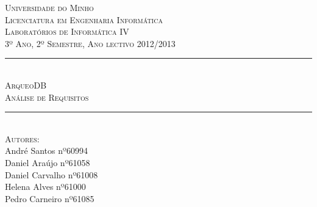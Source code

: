﻿\documentclass[12pt,a4paper]{article}
\begin{document}
\begin{titlepage}
\onehalfspacing

\newcommand{\HRule}{\rule{\linewidth}{0.5mm}} %

\center %
 

\textsc{\LARGE Universidade do Minho}\\[1.5cm] %
\textsc{\Large Licenciatura em Engenharia Informática}\\[0.5cm] %
\textsc{\large Laboratórios de Informática IV}\\[0.5cm] %
\textsc{3º Ano, 2º Semestre, Ano lectivo 2012/2013}\\[0.5cm]


\HRule \\[0.4cm]
\textsc{\Large ArqueoDB}\\[0.4cm] %
\textsc{ \large Análise de Requisitos}\\[0.4cm] %
\HRule \\[1.5cm]
 

\textsc{\large Autores:}\\
{André Santos nº60994 \\ Daniel Araújo nº61058 \\ Daniel Carvalho nº61008\\ Helena Alves nº61000 \\ Pedro Carneiro nº61085}\\[1cm] %



\end{titlepage}
\end{document}
